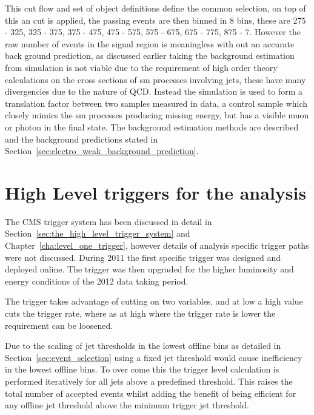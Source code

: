 This cut flow and set of object definitions define the common selection, on top 
of this an \alt cut is applied, the passing events are then binned in 8 \HT 
bins, these are \unit{275}{\GeV} - \unit{325}{\GeV}, \unit{325}{\GeV} - 
\unit{375}{\GeV}, \unit{375}{\GeV} - \unit{475}{\GeV}, \unit{475}{\GeV} - 
\unit{575}{\GeV}, \unit{575}{\GeV} - \unit{675}{\GeV}, \unit{675}{\GeV} - 
\unit{775}{\GeV}, \unit{875}{\GeV} - \unit{7}{\TeV}.
However the raw number of events in the signal region is meaningless with out 
an accurate back ground prediction, as discussed earlier taking the background 
estimation from simulation is not viable due to the requirement of high order 
theory calculations on the cross sections of \ac{sm} processes involving 
jets, these have many divergencies due to the nature of QCD. Instead the 
simulation is used to form a translation factor between two samples measured in 
data, a control sample which closely mimics the \ac{sm} processes 
producing missing energy, but has a visible muon or photon in the final state. 
The background estimation methods are described and the background predictions 
stated in Section~\ref{sec:electro_weak_background_prediction}.


\section{High Level triggers for the \alt analysis} %
\label{sec:high_level_triggers_for_the_alt_analysis}
The CMS trigger system has been discussed in detail in 
Section~\ref{sec:the_high_level_trigger_system} and 
Chapter~\ref{cha:level_one_trigger}, however details of analysis specific 
trigger paths were not discussed. During 2011 the first \alt specific trigger 
was designed and deployed online. The trigger was then upgraded for the higher 
luminosity and energy conditions of the 2012 data taking period.


The trigger takes advantage of cutting on two variables, \HT and \alt at low 
\HT a high \alt value cuts the trigger rate, where as at high \HT where the
trigger rate is lower the \alt requirement can be loosened.

Due to the scaling of jet thresholds in the lowest offline \HT bins as detailed 
in Section~\ref{sec:event_selection} using a fixed jet threshold would cause 
inefficiency in the lowest offline \HT bins. To over come this the trigger 
level \alt calculation is performed iteratively for all jets above a predefined 
threshold. This raises the total number of accepted events whilst adding the 
benefit of being efficient for any offline jet threshold above the minimum 
trigger jet threshold.

